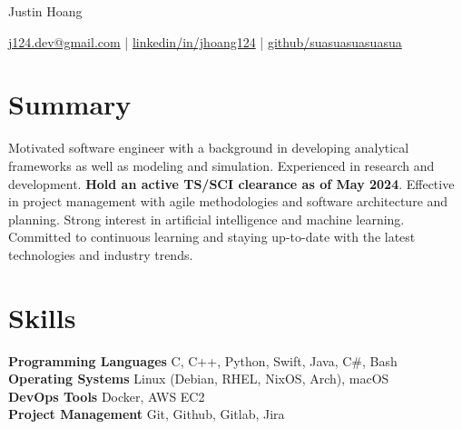 \documentclass[11pt]{article}       %
\begin{document}
\centerline{\Huge Justin Hoang}

\vspace{5pt}

\centerline{
      \href{mailto:j124.dev@gmail.com}{j124.dev@gmail.com}
      | \href{https://www.linkedin.com/in/jhoang124/}{linkedin/in/jhoang124}
      | \href{https://github.com/suasuasuasuasua}{github/suasuasuasuasua}
}

\vspace{-10pt}

\section*{Summary}
Motivated software engineer with a background in developing analytical
frameworks as well as modeling and simulation. Experienced in research and
development. \textbf{Hold an active TS/SCI clearance as of May 2024}. Effective
in project management with agile methodologies and software architecture and
planning. Strong interest in artificial intelligence and machine learning.
Committed to continuous learning and staying up-to-date with the latest
technologies and industry trends.
\vspace{-6.5pt}

\section*{Skills}
\textbf{Programming Languages} C, C++, Python, Swift, Java, C\#, Bash \\
\textbf{Operating Systems} Linux (Debian, RHEL, NixOS, Arch), macOS \\
\textbf{DevOps Tools} Docker, AWS EC2 \\
\textbf{Project Management} Git, Github, Gitlab, Jira \\

\vspace{-6.5pt}
\end{document}
